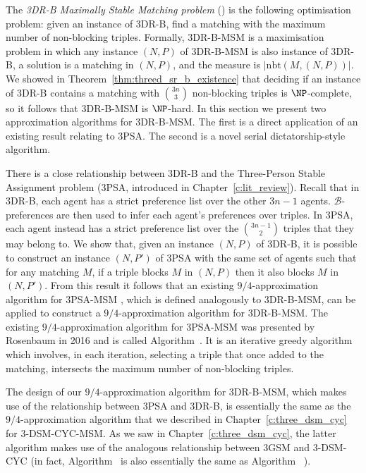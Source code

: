 The \emph{3DR-B Maximally Stable Matching problem} () is the following optimisation problem: given an instance of 3DR-B, find a matching with the maximum number of non-blocking triples. Formally, 3DR-B-MSM is a maximisation problem in which any instance $(N, P)$ of 3DR-B-MSM is also instance of 3DR-B, a solution is a matching in $(N, P)$, and the measure is $|\textrm{nbt}(M, (N, P))|$. We showed in Theorem~\ref{thm:threed_sr_b_existence} that deciding if an instance of 3DR-B contains a matching with $\binom{3n}{3}$ non-blocking triples is $\NP$-complete, so it follows that 3DR-B-MSM is $\NP$-hard. In this section we present two approximation algorithms for 3DR-B-MSM. The first is a direct application of an existing result relating to 3PSA. The second is a novel serial dictatorship-style algorithm.

There is a close relationship between 3DR-B and the Three-Person Stable Assignment problem (3PSA, introduced in Chapter~\ref{c:lit_review}). Recall that in 3DR-B, each agent has a strict preference list over the other $3n - 1$ agents. $\mathscr{B}$-preferences are then used to infer each agent's preferences over triples. In 3PSA, each agent instead has a strict preference list over the $\binom{3n - 1}{2}$ triples that they may belong to. We show that, given an instance $(N, P)$ of 3DR-B, it is possible to construct an instance $(N, P')$ of 3PSA with the same set of agents such that for any matching $M$, if a triple blocks $M$ in $(N, P)$ then it also blocks $M$ in $(N, P')$. From this result it follows that an existing $9/4$-approximation algorithm for 3PSA-MSM \cite{rosenbaum16}, which is defined analogously to 3DR-B-MSM, can be applied to construct a $9/4$-approximation algorithm for 3DR-B-MSM. The existing $9/4$-approximation algorithm for 3PSA-MSM was presented by Rosenbaum in 2016 \cite{rosenbaum16} and is called Algorithm~. It is an iterative greedy algorithm which involves, in each iteration, selecting a triple that once added to the matching, intersects the maximum number of non-blocking triples. 

The design of our $9/4$-approximation algorithm for 3DR-B-MSM, which makes use of the relationship between 3PSA and 3DR-B, is essentially the same as the $9/4$-approximation algorithm that we described in Chapter~\ref{c:three_dsm_cyc} for 3-DSM-CYC-MSM. As we saw in Chapter~\ref{c:three_dsm_cyc}, the latter algorithm makes use of the analogous relationship between 3GSM and 3-DSM-CYC (in fact, Algorithm~ is also essentially the same as Algorithm~ \cite{rosenbaum16}).

